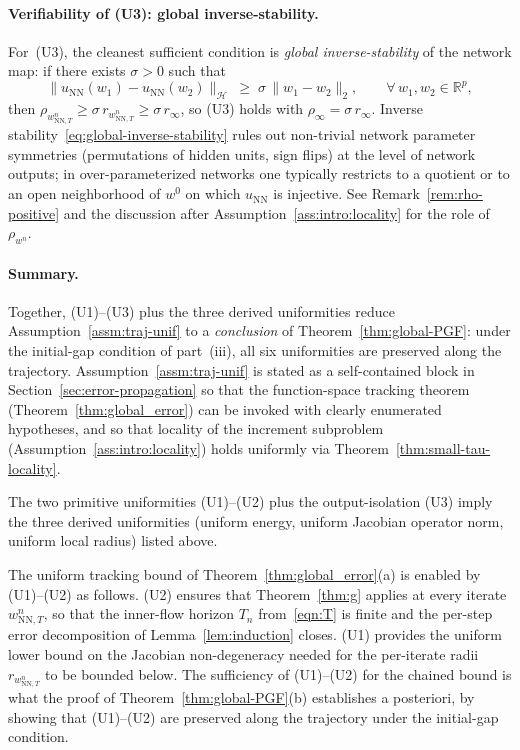 \documentclass[twoside,11pt]{article}
\newcommand{\R}{\mathbb{R}}
\newcommand{\NN}{\mathrm{NN}}
\newcommand{\calH}{\mathcal{H}}
\begin{document}
\paragraph{Verifiability of (U3): global inverse-stability.}
For~(U3), the cleanest sufficient condition is \emph{global inverse-stability} of the network map: if there exists $\sigma>0$ such that
\begin{equation}\label{eq:global-inverse-stability}
\|u_\NN(w_1)-u_\NN(w_2)\|_\calH\;\ge\;\sigma\,\|w_1-w_2\|_2,\qquad \forall\,w_1,w_2\in\R^p,
\end{equation}
then $\rho_{w^n_{\NN,T}}\ge\sigma\,r_{w^n_{\NN,T}}\ge\sigma\,r_\infty$, so (U3) holds with $\rho_\infty=\sigma\,r_\infty$. Inverse stability~\eqref{eq:global-inverse-stability} rules out non-trivial network parameter symmetries (permutations of hidden units, sign flips) at the level of network outputs; in over-parameterized networks one typically restricts to a quotient or to an open neighborhood of $w^0$ on which $u_\NN$ is injective. See Remark~\ref{rem:rho-positive} and the discussion after Assumption~\ref{ass:intro:locality} for the role of $\rho_{w^n}$.

\paragraph{Summary.}
Together, (U1)--(U3) plus the three derived uniformities reduce Assumption~\ref{assm:traj-unif} to a \emph{conclusion} of Theorem~\ref{thm:global-PGF}: under the initial-gap condition of part~(iii), all six uniformities are preserved along the trajectory. Assumption~\ref{assm:traj-unif} is stated as a self-contained block in Section~\ref{sec:error-propagation} so that the function-space tracking theorem (Theorem~\ref{thm:global_error}) can be invoked with clearly enumerated hypotheses, and so that locality of the increment subproblem (Assumption~\ref{ass:intro:locality}) holds uniformly via Theorem~\ref{thm:small-tau-locality}.

\begin{remark}\label{rem:traj-unif}
The two primitive uniformities (U1)--(U2) plus the output-isolation (U3) imply the three derived uniformities (uniform energy, uniform Jacobian operator norm, uniform local radius) listed above.
\end{remark}

\begin{remark}\label{rem:tracking-uniformity}
The uniform tracking bound of Theorem~\ref{thm:global_error}(a) is enabled by (U1)--(U2) as follows. (U2) ensures that Theorem~\ref{thm:g} applies at every iterate $w^n_{\NN,T}$, so that the inner-flow horizon $T_n$ from~\eqref{eqn:T} is finite and the per-step error decomposition of Lemma~\ref{lem:induction} closes. (U1) provides the uniform lower bound on the Jacobian non-degeneracy needed for the per-iterate radii $r_{w^n_{\NN,T}}$ to be bounded below. The sufficiency of (U1)--(U2) for the chained bound is what the proof of Theorem~\ref{thm:global-PGF}(b) establishes a posteriori, by showing that (U1)--(U2) are preserved along the trajectory under the initial-gap condition.
\end{remark}
\end{document}
